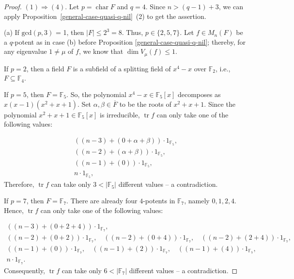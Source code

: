 \documentclass{amsart}
\DeclareMathOperator{\Char}{char}
\DeclareMathOperator{\tr}{tr}
\theoremstyle{definition}
\theoremstyle{remark}
\numberwithin{equation}{section}
\begin{document}
\begin{proof}
$(1) \Rightarrow (4)$. Let $p = \Char F$ and $q = 4$. Since $n > (q-1) + 3$, we can apply Proposition~\ref{general-case-quasi-q-nil}~(2) to get the assertion.

\medskip

(a) If $\mathrm{gcd}(p, 3)$ = 1, then $|F| \leq 2^3 = 8$. Thus, $p \in \{2,5,7\}$. Let $f \in M_{n}(F)$ be a $q$-potent as in case (b) before Proposition \ref{general-case-quasi-q-nil}; thereby, for any eigenvalue $1 \not= \mu$ of $f$, we know that $\dim V_{\mu}(f) \leq 1$.

\smallskip

If $p = 2$, then a field $F$ is a subfield of a splitting field of $x^{4}-x$ over $\mathbb{F}_{2}$, i.e., $F \subseteq \mathbb{F}_{4}$.

\smallskip

If $p = 5$, then $F = \mathbb{F}_{5}$. So, the polynomial $x^4 - x \in \mathbb{F}_{5}[x]$ decomposes as $x(x-1)(x^2 + x + 1)$. Set $\alpha, \beta \in \overline{F}$ to be the roots of $x^2 + x + 1$. Since the polynomial $x^2 + x + 1 \in \mathbb{F}_{5}[x]$ is irreducible, $\tr f$ can only take one of the following values:

\begin{gather*}
((n-3) + (0 + \alpha + \beta)) \cdot 1_{\mathbb{F}_{5}},
  \\
((n-2) + (\alpha + \beta)) \cdot 1_{\mathbb{F}_{5}},
  \\
((n-1) + (0)) \cdot 1_{\mathbb{F}_{5}},
  \\
n \cdot 1_{\mathbb{F}_{5}},
\end{gather*}
Therefore, $\tr f$ can take only $3 < |\mathbb{F}_{5}|$ different values -- a contradiction.

\smallskip

If $p = 7$, then $F = \mathbb{F}_{7}$. There are already four $4$-potents in $\mathbb{F}_{7}$, namely $0, 1, 2, 4$. Hence, $\tr f$ can only take one of the following values:

\begin{gather*}
((n-3) + (0 + 2 + 4)) \cdot 1_{\mathbb{F}_{7}}, %
    \\
((n-2) + (0 + 2)) \cdot 1_{\mathbb{F}_{7}},\quad %
((n-2) + (0 + 4)) \cdot 1_{\mathbb{F}_{7}},\quad %
((n-2) + (2 + 4)) \cdot 1_{\mathbb{F}_{7}}, %
    \\
((n-1) + (0)) \cdot 1_{\mathbb{F}_{7}},\quad %
((n-1) + (2)) \cdot 1_{\mathbb{F}_{7}},\quad %
((n-1) + (4)) \cdot 1_{\mathbb{F}_{7}}, %
    \\
n \cdot 1_{\mathbb{F}_{7}}.  %
\end{gather*}
Consequently, $\tr f$ can take only $6 < |\mathbb{F}_{7}|$ different values -- a contradiction.


\end{proof}
\end{document}
